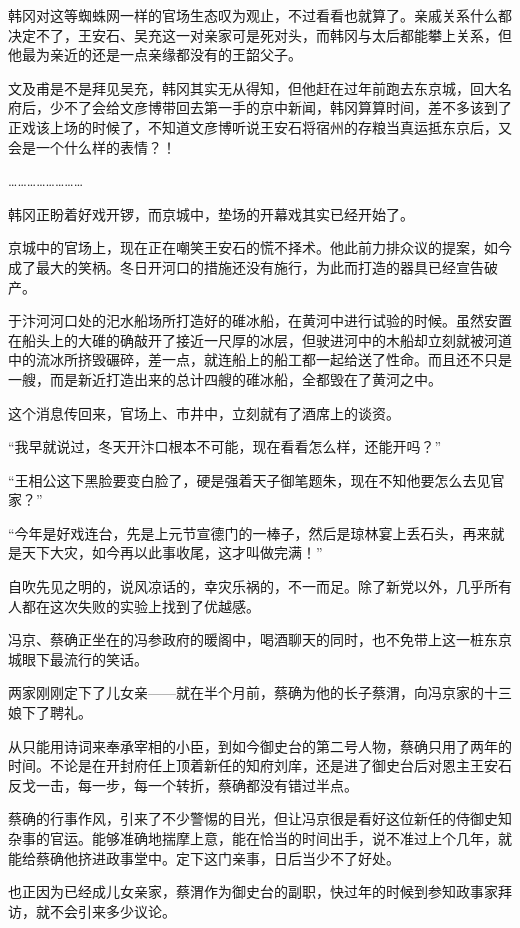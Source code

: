韩冈对这等蜘蛛网一样的官场生态叹为观止，不过看看也就算了。亲戚关系什么都决定不了，王安石、吴充这一对亲家可是死对头，而韩冈与太后都能攀上关系，但他最为亲近的还是一点亲缘都没有的王韶父子。

文及甫是不是拜见吴充，韩冈其实无从得知，但他赶在过年前跑去东京城，回大名府后，少不了会给文彦博带回去第一手的京中新闻，韩冈算算时间，差不多该到了正戏该上场的时候了，不知道文彦博听说王安石将宿州的存粮当真运抵东京后，又会是一个什么样的表情？！

……………………

韩冈正盼着好戏开锣，而京城中，垫场的开幕戏其实已经开始了。

京城中的官场上，现在正在嘲笑王安石的慌不择术。他此前力排众议的提案，如今成了最大的笑柄。冬日开河口的措施还没有施行，为此而打造的器具已经宣告破产。

于汴河河口处的汜水船场所打造好的碓冰船，在黄河中进行试验的时候。虽然安置在船头上的大碓的确敲开了接近一尺厚的冰层，但驶进河中的木船却立刻就被河道中的流冰所挤毁碾碎，差一点，就连船上的船工都一起给送了性命。而且还不只是一艘，而是新近打造出来的总计四艘的碓冰船，全都毁在了黄河之中。

这个消息传回来，官场上、市井中，立刻就有了酒席上的谈资。

“我早就说过，冬天开汴口根本不可能，现在看看怎么样，还能开吗？”

“王相公这下黑脸要变白脸了，硬是强着天子御笔题朱，现在不知他要怎么去见官家？”

“今年是好戏连台，先是上元节宣德门的一棒子，然后是琼林宴上丢石头，再来就是天下大灾，如今再以此事收尾，这才叫做完满！”

自吹先见之明的，说风凉话的，幸灾乐祸的，不一而足。除了新党以外，几乎所有人都在这次失败的实验上找到了优越感。

冯京、蔡确正坐在的冯参政府的暖阁中，喝酒聊天的同时，也不免带上这一桩东京城眼下最流行的笑话。

两家刚刚定下了儿女亲——就在半个月前，蔡确为他的长子蔡渭，向冯京家的十三娘下了聘礼。

从只能用诗词来奉承宰相的小臣，到如今御史台的第二号人物，蔡确只用了两年的时间。不论是在开封府任上顶着新任的知府刘庠，还是进了御史台后对恩主王安石反戈一击，每一步，每一个转折，蔡确都没有错过半点。

蔡确的行事作风，引来了不少警惕的目光，但让冯京很是看好这位新任的侍御史知杂事的官运。能够准确地揣摩上意，能在恰当的时间出手，说不准过上个几年，就能给蔡确他挤进政事堂中。定下这门亲事，日后当少不了好处。

也正因为已经成儿女亲家，蔡渭作为御史台的副职，快过年的时候到参知政事家拜访，就不会引来多少议论。

